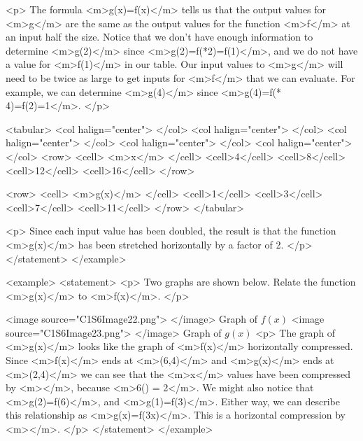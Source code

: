                 <p>
                    The formula <m>g(x)=f(x)</m> tells us that the output values for <m>g</m> are the same as the output values for the function <m>f</m> at an input half the size.
                    Notice that we don’t have enough information to determine <m>g(2)</m> since <m>g(2)=f(*2)=f(1)</m>, and we do not have a value for <m>f(1)</m> in our table.
                    Our input values to <m>g</m> will need to be twice as large to get inputs for <m>f</m> that we can evaluate.
                    For example, we can determine <m>g(4)</m> since <m>g(4)=f(* 4)=f(2)=1</m>.
                </p>

                <tabular>
                    <col halign="center"> </col> <col halign="center"> </col> <col halign="center"> </col> <col halign="center"> </col> <col halign="center"> </col>
                    <row>
                        <cell> <m>x</m> </cell>
                        <cell>4</cell>
                        <cell>8</cell>
                        <cell>12</cell>
                        <cell>16</cell>
                    </row>

                    <row>
                        <cell> <m>g(x)</m> </cell>
                        <cell>1</cell>
                        <cell>3</cell>
                        <cell>7</cell>
                        <cell>11</cell>
                    </row>
                </tabular>

                <p>
                    Since each input value has been doubled, the result is that the function <m>g(x)</m> has been stretched horizontally by a factor of 2.
                </p>
            </statement>
        </example>

        <example>
            <statement>
                <p>
                    Two graphs are shown below.
                    Relate the function <m>g(x)</m> to <m>f(x)</m>.
                </p>

                <image source="C1S6Image22.png">
                </image>
                Graph of $f(x)$
                <image source="C1S6Image23.png">
                </image>
                Graph of $g(x)$
                <p>
                    The graph of <m>g(x)</m> looks like the graph of <m>f(x)</m> horizontally compressed.
                    Since <m>f(x)</m> ends at <m>(6,4)</m> and <m>g(x)</m> ends at <m>(2,4)</m> we can see that the <m>x</m> values have been compressed by <m></m>, because <m>6() = 2</m>.
                    We might also notice that <m>g(2)=f(6)</m>, and <m>g(1)=f(3)</m>.
                    Either way, we can describe this relationship as <m>g(x)=f(3x)</m>.
                    This is a horizontal compression by <m></m>.
                </p>
            </statement>
        </example>

